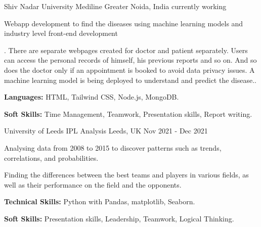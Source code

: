 

\begin{cventries}

  \cventry
    {Shiv Nadar University} %
    {Mediline} %
    {Greater Noida, India} %
    {currently working} %
    {
      \begin{cvitems} %
        \item {Webapp development to find the diseases using machine learning models and industry level front-end development}
        \item {. There are separate webpages created for doctor and patient separately. Users can access the personal records of himself, his previous reports and so on. And so does the doctor only if an appointment is booked to avoid data privacy issues. A machine learning model is being deployed to understand and predict the disease..}
        \item {\textbf{Languages:}  HTML, Tailwind CSS, Node.js, MongoDB.}
        \item {\textbf{Soft Skills:} Time Management, Teamwork, Presentation skills, Report writing.}
      \end{cvitems}
    }


  \cventry
    {University of Leeds} %
    {IPL Analysis} %
    {Leeds, UK} %
    {Nov 2021 - Dec 2021} %
    {
      \begin{cvitems} %
        \item {Analysing data from 2008 to 2015 to discover patterns such as trends, correlations, and probabilities.}
        \item {Finding the differences between the best teams and players in various fields, as well as their performance on the field and the opponents.}
        \item {\textbf{Technical Skills:} Python with Pandas, matplotlib, Seaborn.}
        \item {\textbf{Soft Skills:} Presentation skills, Leadership, Teamwork, Logical Thinking.}
      \end{cvitems}
    }


\end{cventries}
